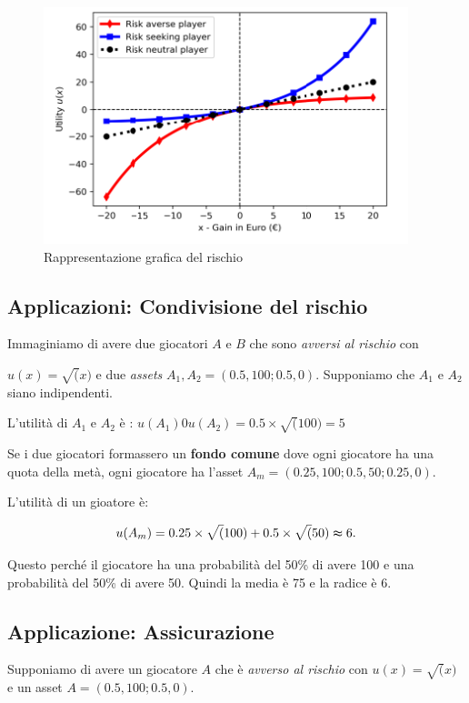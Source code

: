 \begin{figure}[H]
    \centering
    \includegraphics[scale=0.7]{chapters/images/rishio.png}
    \caption{Rappresentazione grafica del rischio}
    \label{fig:rischio}
\end{figure}

\subsection{Applicazioni: Condivisione del rischio}

Immaginiamo di avere due giocatori $A$ e $B$ che sono \textit{avversi al
    rischio} con

$u(x) = \sqrt(x)$ e due \textit{assets} $A_1, A_2 = (0.5, 100; 0.5, 0)$. Supponiamo che $A_1$ e $A_2$ siano indipendenti.

L'utilità di $A_1$ e $A_2$ è : $u(A_1) 0 u(A_2) = 0.5 \times \sqrt(100) = 5$

Se i due giocatori formassero un \textbf{fondo comune} dove ogni giocatore ha
una quota della metà, ogni giocatore ha l'asset $A_m = (0.25, 100; 0.5, 50;
    0.25, 0)$.

L'utilità di un gioatore è:

\[
    u(A_m) = 0.25 \times \sqrt(100) + 0.5 \times \sqrt(50) \thickapprox 6.
\]

Questo perché il giocatore ha una probabilità del 50\% di avere 100 e una
probabilità del 50\% di avere 50. Quindi la media è 75 e la radice è 6.

\subsection{Applicazione: Assicurazione}

Supponiamo di avere un giocatore $A$ che è \textit{avverso al rischio} con $u(x) = \sqrt(x)$ e un 
asset $A = (0.5, 100; 0.5, 0)$. 

